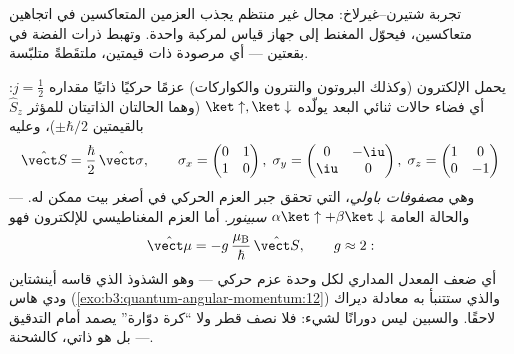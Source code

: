 \begin{omfigure}

{\small تجربة شتيرن--غيرلاخ: مجال غير منتظم يجذب
العزمين المتعاكسين في اتجاهين متعاكسين، فيحوّل المغنط إلى جهاز
قياس لمركبة  واحدة. وتهبط ذرات الفضة في بقعتين ---
أي مرصودة ذات قيمتين، ملتقَطةً متلبّسة.}
\end{omfigure}

\begin{definition}\label{def:b3:spin-two-level:spin}
يحمل الإلكترون (وكذلك البروتون والنترون والكواركات) عزمًا
حركيًا ذاتيًا مقداره $j = \tfrac12$: أي فضاء حالات ثنائي البعد
يولّده $\ket\uparrow, \ket\downarrow$ (وهما الحالتان الذاتيتان
للمؤثر $\hat S_z$ بالقيمتين $\pm\hbar/2$)، وعليه
\[
\hat{\vect S} = \frac\hbar2\,\hat{\vect\sigma} , \qquad
\sigma_x = \begin{pmatrix}0&1\\1&0\end{pmatrix} ,\;
\sigma_y = \begin{pmatrix}0&-\iu\\\iu&0\end{pmatrix} ,\;
\sigma_z = \begin{pmatrix}1&0\\0&-1\end{pmatrix}
\]
--- وهي \emph{مصفوفات باولي}، التي تحقق جبر العزم
الحركي في أصغر بيت ممكن له. والحالة العامة
$\alpha\ket\uparrow + \beta\ket\downarrow$ \emph{سبينور}. أما
العزم المغناطيسي للإلكترون فهو
\[
\hat{\vect\mu} = -g\,\frac{\mu_{\text{B}}}{\hbar}\,\hat{\vect S} ,
\qquad g \approx 2 :
\]
أي ضعف المعدل المداري لكل وحدة عزم حركي --- وهو الشذوذ
الذي قاسه أينشتاين ودي هاس
(\cref{exo:b3:quantum-angular-momentum:12}) والذي ستتنبأ به
معادلة ديراك لاحقًا. والسبين ليس دورانًا لشيء: فلا نصف قطر
ولا ``كرة دوّارة'' يصمد أمام التدقيق --- بل هو ذاتي، كالشحنة.
\end{definition}

